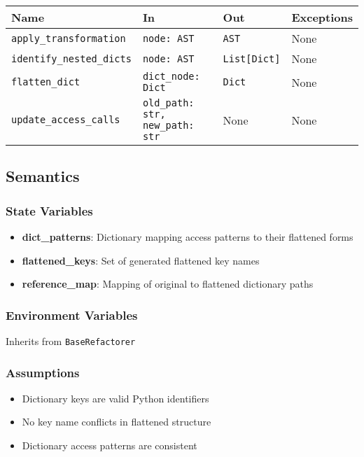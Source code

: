 \documentclass[12pt, titlepage]{article}
\begin{document}
\begin{tabularx}{\linewidth}{|l|>{\raggedright\arraybackslash}X|l|l|}
\hline
\textbf{Name} & \textbf{In} & \textbf{Out} & \textbf{Exceptions} \\\hline
\texttt{apply\_transformation} & \texttt{node: AST} & \texttt{AST} & None \\\hline
\texttt{identify\_nested\_dicts} & \texttt{node: AST} & \texttt{List[Dict]} & None \\\hline
\texttt{flatten\_dict} & \texttt{dict\_node: Dict} & \texttt{Dict} & None \\\hline
\texttt{update\_access\_calls} & \texttt{old\_path: str, new\_path: str} & None & None \\\hline
\end{tabularx}

\subsection{Semantics}

\subsubsection{State Variables}
\begin{itemize}
  \item \textbf{dict\_patterns}: Dictionary mapping access patterns to their flattened forms
  \item \textbf{flattened\_keys}: Set of generated flattened key names
  \item \textbf{reference\_map}: Mapping of original to flattened dictionary paths
\end{itemize}

\subsubsection{Environment Variables}
Inherits from \texttt{BaseRefactorer}

\subsubsection{Assumptions}
\begin{itemize}
  \item Dictionary keys are valid Python identifiers
  \item No key name conflicts in flattened structure
  \item Dictionary access patterns are consistent
\end{itemize}
\end{document}
